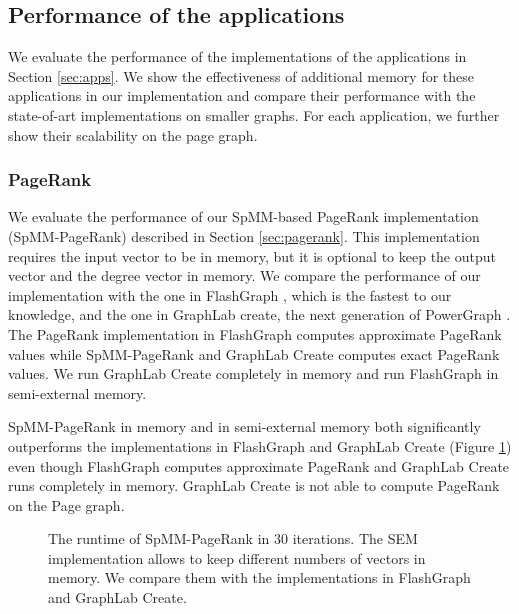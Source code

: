 \subsection{Performance of the applications}

We evaluate the performance of the implementations of the applications in
Section \ref{sec:apps}. We show the effectiveness of additional memory for
these applications in our implementation and compare their performance
with the state-of-art implementations on smaller graphs. For each application,
we further show their scalability on the page graph.

\subsubsection{PageRank}
We evaluate the performance of our SpMM-based PageRank implementation
(SpMM-PageRank) described
in Section \ref{sec:pagerank}. This implementation requires the input vector
to be in memory, but it is optional to keep the output vector and the degree
vector in memory. We compare the performance of our implementation with
the one in FlashGraph \cite{flashgraph}, which is the fastest to our knowledge,
and the one in GraphLab create, the next generation of
PowerGraph \cite{powergraph}. The PageRank implementation in FlashGraph computes
approximate PageRank values while SpMM-PageRank and GraphLab Create computes
exact PageRank values. We run GraphLab Create completely in memory and run
FlashGraph in semi-external memory.

SpMM-PageRank in memory and in semi-external memory both significantly outperforms
the implementations in FlashGraph and GraphLab Create (Figure \ref{perf:pagerank})
even though FlashGraph computes approximate PageRank and GraphLab Create runs
completely in memory. GraphLab Create is not able to compute PageRank on the Page
graph.


\begin{figure}
	\begin{center}
		\footnotesize
		
		\caption{The runtime of SpMM-PageRank in 30 iterations. The SEM
			implementation allows to keep different numbers of vectors in memory.
			We compare them with the implementations in FlashGraph and GraphLab
		Create.}
		\label{perf:pagerank}
	\end{center}
\end{figure}

